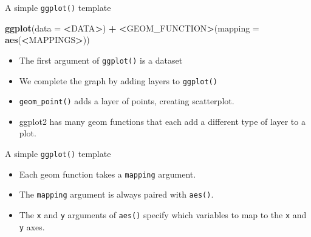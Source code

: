 \documentclass[ignorenonframetext,]{beamer}
\newenvironment{Shaded}{\begin{snugshade}}{\end{snugshade}}
\newcommand{\DataTypeTok}[1]{\textcolor[rgb]{0.13,0.29,0.53}{#1}}
\newcommand{\ErrorTok}[1]{\textcolor[rgb]{0.64,0.00,0.00}{\textbf{#1}}}
\newcommand{\KeywordTok}[1]{\textcolor[rgb]{0.13,0.29,0.53}{\textbf{#1}}}
\newcommand{\NormalTok}[1]{#1}
\newcommand{\OperatorTok}[1]{\textcolor[rgb]{0.81,0.36,0.00}{\textbf{#1}}}
\newcommand{\StringTok}[1]{\textcolor[rgb]{0.31,0.60,0.02}{#1}}
\begin{document}
\begin{frame}[fragile]{A simple \texttt{ggplot()} template}
\protect\hypertarget{a-simple-ggplot-template}{}

\begin{Shaded}
\begin{Highlighting}[]
\KeywordTok{ggplot}\NormalTok{(}\DataTypeTok{data =} \OperatorTok{<}\NormalTok{DATA}\OperatorTok{>}\NormalTok{) }\OperatorTok{+}\StringTok{ }
\StringTok{  }\ErrorTok{<}\NormalTok{GEOM_FUNCTION}\OperatorTok{>}\NormalTok{(}\DataTypeTok{mapping =} \KeywordTok{aes}\NormalTok{(}\OperatorTok{<}\NormalTok{MAPPINGS}\OperatorTok{>}\NormalTok{))}
\end{Highlighting}
\end{Shaded}

\begin{itemize}
\item
  The first argument of \texttt{ggplot()} is a dataset
\item
  We complete the graph by adding layers to \texttt{ggplot()}
\item
  \texttt{geom\_point()} adds a layer of points, creating scatterplot.
\item
  ggplot2 has many geom functions that each add a different type of
  layer to a plot.
\end{itemize}

\end{frame}

\begin{frame}[fragile]{A simple \texttt{ggplot()} template}
\protect\hypertarget{a-simple-ggplot-template-1}{}

\begin{itemize}
\item
  Each geom function takes a \texttt{mapping} argument.
\item
  The \texttt{mapping} argument is always paired with \texttt{aes()}.
\item
  The \texttt{x} and \texttt{y} arguments of \texttt{aes()} specify
  which variables to map to the \texttt{x} and \texttt{y} axes.
\end{itemize}

\end{frame}
\end{document}
